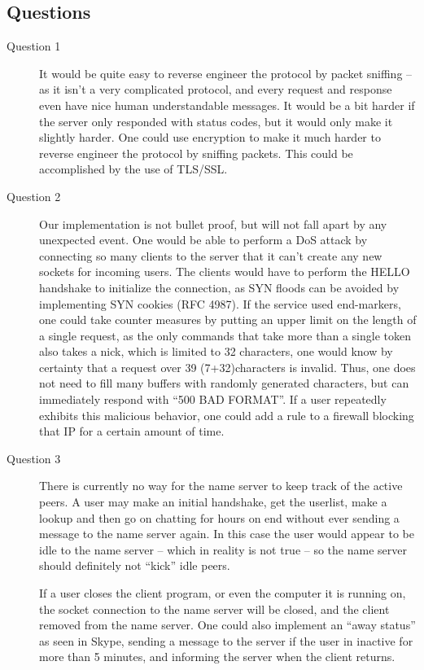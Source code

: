\subsection{Questions}
\begin{description} %
    \item[Question 1]
        It would be quite easy to reverse engineer the protocol by packet sniffing -- as it isn't a very complicated protocol, and every request and response even have nice human understandable messages. It would be a bit harder if the server only responded with status codes, but it would only make it slightly harder.
        One could use encryption to make it much harder to reverse engineer the protocol by sniffing packets. This could be accomplished by the use of TLS/SSL.

    \item[Question 2]
        Our implementation is not bullet proof, but will not fall apart by any unexpected event. One would be able to perform a DoS attack by connecting so many clients to the server that it can't create any new sockets for incoming users. The clients would have to perform the HELLO handshake to initialize the connection, as SYN floods can be avoided by implementing SYN cookies (RFC 4987). If the service used end-markers, one could take counter measures by putting an upper limit on the length of a single request, as the only commands that take more than a single token also takes a nick, which is limited to 32 characters, one would know by certainty that a request over 39 (7+32)characters is invalid. Thus, one does not need to fill many buffers with randomly generated characters, but can immediately respond with ``500 BAD FORMAT''. If a user repeatedly exhibits this malicious behavior, one could add a rule to a firewall blocking that IP for a certain amount of time.

    \item[Question 3]
        There is currently no way for the name server to keep track of the active peers. A user may make an initial handshake, get the userlist, make a lookup and then go on chatting for hours on end without ever sending a message to the name server again. In this case the user would appear to be idle to the name server -- which in reality is not true -- so the name server should definitely not ``kick'' idle peers.

        If a user closes the client program, or even the computer it is running on, the socket connection to the name server will be closed, and the client removed from the name server.  One could also implement an ``away status'' as seen in Skype, sending a message to the server if the user in inactive for more than 5 minutes, and informing the server when the client returns.


\end{description}

